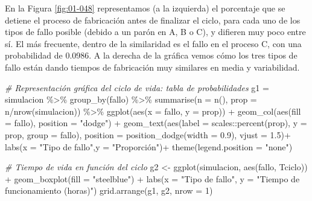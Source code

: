 \documentclass[
]{book}
\newenvironment{Shaded}{\begin{snugshade}}{\end{snugshade}}
\newcommand{\AttributeTok}[1]{\textcolor[rgb]{0.77,0.63,0.00}{#1}}
\newcommand{\CommentTok}[1]{\textcolor[rgb]{0.56,0.35,0.01}{\textit{#1}}}
\newcommand{\DecValTok}[1]{\textcolor[rgb]{0.00,0.00,0.81}{#1}}
\newcommand{\FloatTok}[1]{\textcolor[rgb]{0.00,0.00,0.81}{#1}}
\newcommand{\FunctionTok}[1]{\textcolor[rgb]{0.00,0.00,0.00}{#1}}
\newcommand{\NormalTok}[1]{#1}
\newcommand{\OtherTok}[1]{\textcolor[rgb]{0.56,0.35,0.01}{#1}}
\newcommand{\SpecialCharTok}[1]{\textcolor[rgb]{0.00,0.00,0.00}{#1}}
\newcommand{\StringTok}[1]{\textcolor[rgb]{0.31,0.60,0.02}{#1}}
\theoremstyle{definition}
\theoremstyle{definition}
\theoremstyle{definition}
\theoremstyle{definition}
\theoremstyle{remark}
\begin{document}
En la Figura \ref{fig:01-048} representamos (a la izquierda) el porcentaje que se detiene el proceso de fabricación antes de finalizar el ciclo, para cada uno de los tipos de fallo posible (debido a un parón en A, B o C), y difieren muy poco entre sí. El más frecuente, dentro de la similaridad es el fallo en el proceso C, con una probabilidad de 0.0986. A la derecha de la gráfica vemos cómo los tres tipos de fallo están dando tiempos de fabricación muy similares en media y variabilidad.

\begin{Shaded}
\begin{Highlighting}[]
\CommentTok{\#  Representación gráfica del ciclo de vida: tabla de probabilidades}
\NormalTok{g1 }\OtherTok{=}\NormalTok{ simulacion }\SpecialCharTok{\%\textgreater{}\%}
  \FunctionTok{group\_by}\NormalTok{(fallo) }\SpecialCharTok{\%\textgreater{}\%}
  \FunctionTok{summarise}\NormalTok{(}\AttributeTok{n =} \FunctionTok{n}\NormalTok{(), }\AttributeTok{prop =}\NormalTok{ n}\SpecialCharTok{/}\FunctionTok{nrow}\NormalTok{(simulacion)) }\SpecialCharTok{\%\textgreater{}\%}
  \FunctionTok{ggplot}\NormalTok{(}\FunctionTok{aes}\NormalTok{(}\AttributeTok{x =}\NormalTok{ fallo, }\AttributeTok{y =}\NormalTok{ prop)) }\SpecialCharTok{+}
    \FunctionTok{geom\_col}\NormalTok{(}\FunctionTok{aes}\NormalTok{(}\AttributeTok{fill =}\NormalTok{ fallo), }\AttributeTok{position =} \StringTok{"dodge"}\NormalTok{) }\SpecialCharTok{+}
    \FunctionTok{geom\_text}\NormalTok{(}\FunctionTok{aes}\NormalTok{(}\AttributeTok{label =}\NormalTok{ scales}\SpecialCharTok{::}\FunctionTok{percent}\NormalTok{(prop), }
                  \AttributeTok{y =}\NormalTok{ prop, }\AttributeTok{group =}\NormalTok{ fallo),}
              \AttributeTok{position =} \FunctionTok{position\_dodge}\NormalTok{(}\AttributeTok{width =} \FloatTok{0.9}\NormalTok{),}
              \AttributeTok{vjust =} \FloatTok{1.5}\NormalTok{)}\SpecialCharTok{+}
  \FunctionTok{labs}\NormalTok{(}\AttributeTok{x =} \StringTok{"Tipo de fallo"}\NormalTok{,}\AttributeTok{y =} \StringTok{"Proporción"}\NormalTok{)}\SpecialCharTok{+}
  \FunctionTok{theme}\NormalTok{(}\AttributeTok{legend.position =} \StringTok{"none"}\NormalTok{)}


\CommentTok{\# Tiempo de vida en función del ciclo}
\NormalTok{g2 }\OtherTok{\textless{}{-}} \FunctionTok{ggplot}\NormalTok{(simulacion, }\FunctionTok{aes}\NormalTok{(fallo, Tciclo)) }\SpecialCharTok{+} 
  \FunctionTok{geom\_boxplot}\NormalTok{(}\AttributeTok{fill =} \StringTok{"steelblue"}\NormalTok{) }\SpecialCharTok{+}
  \FunctionTok{labs}\NormalTok{(}\AttributeTok{x =} \StringTok{"Tipo de fallo"}\NormalTok{, }\AttributeTok{y =} \StringTok{"Tiempo de funcionamiento (horas)"}\NormalTok{)}
\FunctionTok{grid.arrange}\NormalTok{(g1, g2, }\AttributeTok{nrow =} \DecValTok{1}\NormalTok{)}
\end{Highlighting}
\end{Shaded}
\end{document}
